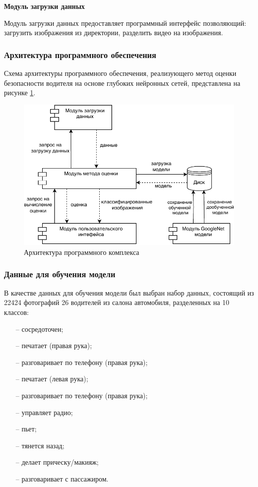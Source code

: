 \textbf{Модуль загрузки  данных}

Модуль загрузки  данных предоставляет программный интерфейс позволяющий: загрузить изображения из директории,
разделить видео на изображения.


\subsubsection{Архитектура программного обеспечения}
Схема архитектуры программного обеспечения, реализующего метод оценки безопасности водителя на основе глубоких
нейронных сетей, представлена на рисунке \ref{fig:arhitectura_po}.

\begin{figure}[H]
	\centering
	\includegraphics[scale=1.2]{img/arhitectura_po.pdf}
	\caption{Архитектура программного комплекса}
	\label{fig:arhitectura_po}
\end{figure}


\subsubsection{Данные для обучения модели}
В качестве данных для обучения модели был выбран набор данных\cite{state-farm-distracted-driver-detection}, состоящий из 22424 фотографий 26 водителей из салона автомобиля, разделенных на 10 классов:
\begin{itemize}[leftmargin=1.6\parindent]
	\item[--] сосредоточен;
	\item[--] печатает (правая рука);
	\item[--] разговаривает по телефону (правая рука);
	\item[--] печатает (левая рука);
	\item[--] разговаривает по телефону (правая рука);
	\item[--] управляет радио;
	\item[--] пьет;
	\item[--] тянется назад;
	\item[--] делает прическу/макияж;
	\item[--] разговаривает с пассажиром.
\end{itemize}

